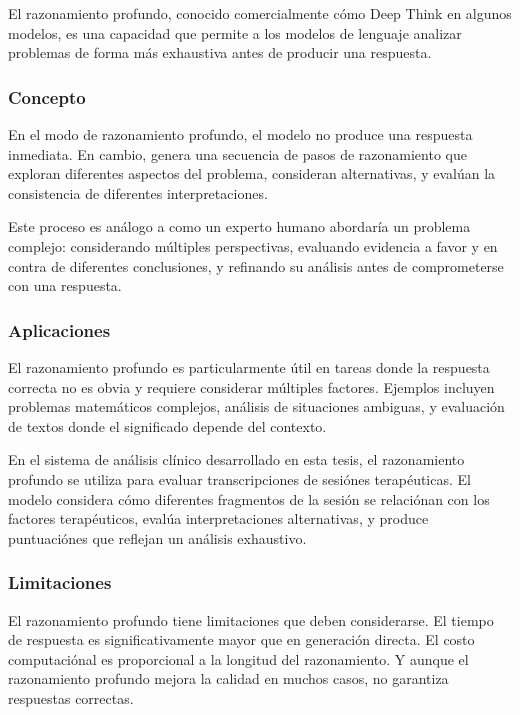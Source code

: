 \documentclass[12pt,a4paper,twoside]{book}
\begin{document}
El razonamiento profundo, conocido comercialmente cómo Deep Think en algunos modelos, es una capacidad que permite a los modelos de lenguaje analizar problemas de forma más exhaustiva antes de producir una respuesta.

\subsubsection{Concepto}

En el modo de razonamiento profundo, el modelo no produce una respuesta inmediata. En cambio, genera una secuencia de pasos de razonamiento que exploran diferentes aspectos del problema, consideran alternativas, y evalúan la consistencia de diferentes interpretaciones.

Este proceso es análogo a como un experto humano abordaría un problema complejo: considerando múltiples perspectivas, evaluando evidencia a favor y en contra de diferentes conclusiones, y refinando su análisis antes de comprometerse con una respuesta.

\subsubsection{Aplicaciones}

El razonamiento profundo es particularmente útil en tareas donde la respuesta correcta no es obvia y requiere considerar múltiples factores. Ejemplos incluyen problemas matemáticos complejos, análisis de situaciones ambiguas, y evaluación de textos donde el significado depende del contexto.

En el sistema de análisis clínico desarrollado en esta tesis, el razonamiento profundo se utiliza para evaluar transcripciones de sesiónes terapéuticas. El modelo considera cómo diferentes fragmentos de la sesión se relaciónan con los factores terapéuticos, evalúa interpretaciones alternativas, y produce puntuaciónes que reflejan un análisis exhaustivo.

\subsubsection{Limitaciones}

El razonamiento profundo tiene limitaciones que deben considerarse. El tiempo de respuesta es significativamente mayor que en generación directa. El costo computaciónal es proporcional a la longitud del razonamiento. Y aunque el razonamiento profundo mejora la calidad en muchos casos, no garantiza respuestas correctas.
\end{document}
